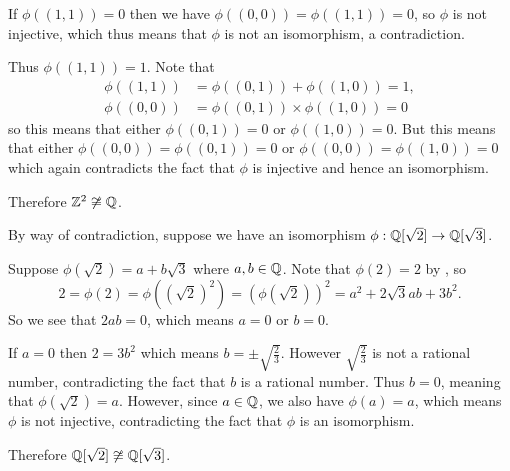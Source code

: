 \begin{questions}
    If $\phi((1,1)) = 0$ then we have $\phi((0,0)) = \phi((1,1)) = 0$, so $\phi$ is not injective, which thus means that $\phi$ is not an isomorphism, a contradiction.

    Thus $\phi((1,1)) = 1$. Note that
    \begin{align*}
        \phi((1,1)) &= \phi((0,1)) + \phi((1,0)) = 1,\\
        \phi((0,0)) &= \phi((0,1)) \times \phi((1,0)) = 0
    \end{align*}
    so this means that either $\phi((0,1)) = 0$ or $\phi((1,0)) = 0$. But this means that either $\phi((0,0)) = \phi((0,1)) = 0$ or $\phi((0,0)) = \phi((1,0)) = 0$ which again contradicts the fact that $\phi$ is injective and hence an isomorphism.

    Therefore $\mathbb{Z}^2 \not\cong \mathbb{Q}$.

    \item By way of contradiction, suppose we have an isomorphism $\phi: \mathbb{Q}[\sqrt2] \to \mathbb{Q}[\sqrt3]$.

    Suppose $\phi(\sqrt2) = a + b\sqrt3$ where $a, b \in \mathbb{Q}$. Note that $\phi(2) = 2$ by , so
    \[
        2 = \phi(2) = \phi\left(\left(\sqrt2\right)^2\right) = \left(\phi(\sqrt2)\right)^2 = a^2 + 2\sqrt3ab + 3b^2.
    \]
    So we see that $2ab = 0$, which means $a = 0$ or $b = 0$.

    If $a = 0$ then $2 = 3b^2$ which means $b = \pm\sqrt{\frac23}$. However $\sqrt{\frac23}$ is not a rational number, contradicting the fact that $b$ is a rational number. Thus $b = 0$, meaning that $\phi(\sqrt2) = a$. However, since $a \in \mathbb{Q}$, we also have $\phi(a) = a$, which means $\phi$ is not injective, contradicting the fact that $\phi$ is an isomorphism.

    Therefore $\mathbb{Q}[\sqrt2] \not\cong \mathbb{Q}[\sqrt3]$.


\end{questions}
